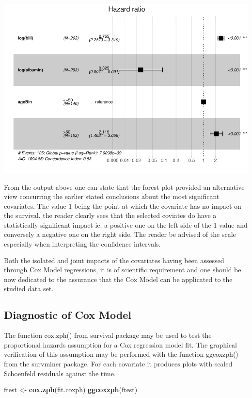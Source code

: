 \documentclass[]{article}
\newenvironment{Shaded}{\begin{snugshade}}{\end{snugshade}}
\newcommand{\KeywordTok}[1]{\textcolor[rgb]{0.13,0.29,0.53}{\textbf{#1}}}
\newcommand{\StringTok}[1]{\textcolor[rgb]{0.31,0.60,0.02}{#1}}
\newcommand{\NormalTok}[1]{#1}
\begin{document}
\includegraphics{report_files/figure-latex/unnamed-chunk-22-1.pdf}

From the output above one can state that the forest plot provided an
alternative view concurring the earlier stated conclusions about the
most significant covariates. The value 1 being the point at which the
covariate has no impact on the survival, the reader clearly sees that
the selected coviates do have a statistically significant impact ie. a
positive one on the left side of the 1 value and conversely a negative
one on the right side. The reader be advised of the scale especially
when interpreting the confidence intervals.

Both the isolated and joint impacts of the covariates having been
assessed through Cox Model regressions, it is of scientific requirement
and one should be now dedicated to the assurance that the Cox Model can
be applicated to the studied data set.

\subsection{Diagnostic of Cox Model}\label{diagnostic-of-cox-model}

The function cox.zph() from survival package may be used to test the
proportional hazards assumption for a Cox regression model fit. The
graphical verification of this assumption may be performed with the
function ggcoxzph() from the survminer package. For each covariate it
produces plots with scaled Schoenfeld residuals against the time.

\begin{Shaded}
\begin{Highlighting}[]
\NormalTok{ftest <-}\StringTok{ }\KeywordTok{cox.zph}\NormalTok{(fit.coxph)}
\KeywordTok{ggcoxzph}\NormalTok{(ftest)}
\end{Highlighting}
\end{Shaded}
\end{document}
